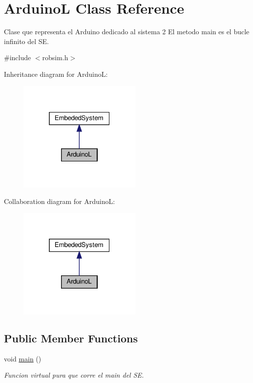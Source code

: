 \hypertarget{classArduinoL}{}\section{ArduinoL Class Reference}
\label{classArduinoL}


Clase que representa el Arduino dedicado al sistema 2 El metodo main es el bucle infinito del SE.  




{\ttfamily \#include $<$robsim.\+h$>$}



Inheritance diagram for ArduinoL\+:
\nopagebreak
\begin{figure}[H]
\begin{center}
\leavevmode
\includegraphics[width=172pt]{classArduinoL__inherit__graph}
\end{center}
\end{figure}


Collaboration diagram for ArduinoL\+:
\nopagebreak
\begin{figure}[H]
\begin{center}
\leavevmode
\includegraphics[width=172pt]{classArduinoL__coll__graph}
\end{center}
\end{figure}
\subsection*{Public Member Functions}
\begin{DoxyCompactItemize}
\item 
void \hyperlink{classArduinoL_a27a3e0f5bfbf48f558bce2d31a72d502}{main} ()
\begin{DoxyCompactList}\small\item\em Funcion virtual pura que corre el main del SE. \end{DoxyCompactList}\end{DoxyCompactItemize}


